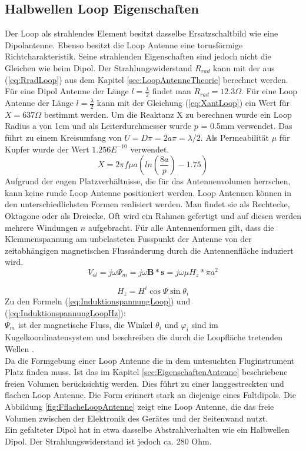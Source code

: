 \subsection{Halbwellen Loop Eigenschaften}
Der Loop als strahlendes Element besitzt dasselbe Ersatzschaltbild wie eine Dipolantenne. Ebenso besitzt die Loop Antenne eine torusförmige Richtcharakteristik. Seine strahlenden Eigenschaften sind jedoch nicht die Gleichen wie beim Dipol. Der Strahlungswiderstand $R_{rad}$ kann mit der aus (\ref{eq:RradLoop}) aus dem Kapitel \ref{sec:LoopAntenneTheorie} berechnet werden. Für eine Dipol Antenne der Länge $l=\frac{\lambda}{2}$ findet man $R_{rad} = 12.3\Omega$. Für eine Loop Antenne der Länge $l=\frac{\lambda}{2}$ kann mit der Gleichung (\ref{eq:XantLoop}) ein Wert für $X = 637 \Omega$ bestimmt werden. Um die Reaktanz X zu berechnen wurde ein Loop Radius a von 1cm und als Leiterdurchmesser wurde $p$ = 0.5mm verwendet. Das führt zu einem Kreisumfang von $U=D\pi=2a\pi=\lambda /2$. Als Permeabilität $\mu $ für Kupfer wurde der Wert $1.256E^{-10}$ verwendet.
\begin{equation}\label{eq:XantLoop}
X= 2\pi f\mu a(ln \left( \frac{8a}{p} \right) - 1.75)
\end{equation}
Aufgrund der engen Platzverhältnisse, die für das Antennenvolumen herrschen, kann keine runde Loop Antenne positioniert werden. Loop Antennen können in den unterschiedlichsten Formen realisiert werden. Man findet sie als Rechtecke, Oktagone oder als Dreiecke. Oft wird ein Rahmen gefertigt und auf diesen werden mehrere Windungen $n$ aufgebracht. Für alle Antennenformen gilt, dass die Klemmenspannung am unbelasteten Fusspunkt der Antenne von der zeitabhängigen magnetischen Flussänderung durch die Antennenfläche induziert wird.
\begin{equation}\label{eq:InduktionspannungLoop}
V_{ol}= j\omega\Psi_{m}=j\omega\textbf{B}*\textbf{s}= j\omega\mu H_{z}*\pi a^{2}
\end{equation}

\begin{equation}\label{eq:InduktionspannungLoopHz}
H_{z}=H^{i}\cos\Psi\sin\theta_{i}
\end{equation}
Zu den Formeln (\ref{eq:InduktionspannungLoop}) und (\ref{eq:InduktionspannungLoopHz}): \\
$\Psi_{m}$ ist der magnetische Fluss, die Winkel $\theta_{i}$ und $\varphi_{i}$ sind im Kugelkoordinatensystem und beschreiben die durch die Loopfläche tretenden Wellen .\\ 
Da die Formgebung einer Loop Antenne die in dem untesuchten Fluginstrument Platz finden muss. Ist das im Kapitel \ref{sec:EigenschaftenAntenne} beschriebene freien Volumen berücksichtig werden. Dies führt zu einer langgestreckten und flachen Loop Antenne. Die Form erinnert stark an diejenige eines Faltdipols. Die Abbildung \ref{fig:FflacheLoopAntenne} zeigt eine Loop Antenne, die das freie Volumen zwischen der Elektronik des Gerätes und der Seitenwand nutzt.\\
Ein gefalteter Dipol hat in etwa dasselbe Abstrahlverhalten wie ein Halbwellen Dipol. Der Strahlungswiderstand ist jedoch ca. 280 Ohm. 

